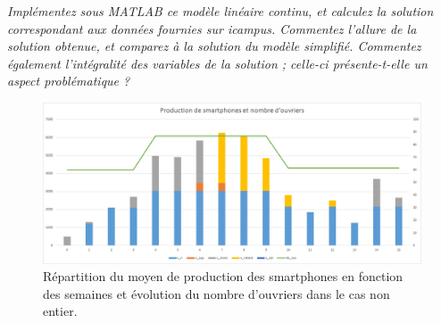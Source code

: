 \question %
\emph{Implémentez sous MATLAB ce modèle linéaire continu,
et calculez la solution correspondant aux données fournies sur icampus.
Commentez l'allure de la solution obtenue, et comparez à la solution du modèle
simplifié. Commentez également l'intégralité des variables de la solution ;
celle-ci présente-t-elle un aspect problématique ?}

\begin{figure}[H]
  \begin{center}
    \includegraphics[scale = 0.75]{img/grapheProductionOuvNonInt.png}
	  \caption{Répartition du moyen de production des smartphones en fonction des semaines et évolution du nombre d'ouvriers dans le cas non entier.}
	  \label{fig:grapheProductionOuvNonInt}
  \end{center}
\end{figure}